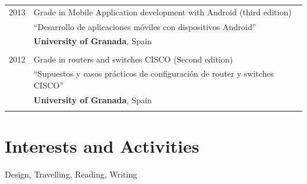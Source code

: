 \documentclass[a4paper,10pt]{article} %
\begin{document}
\begin{tabular}{rl}

\textsc{2013} & Grade in Mobile Application development with Android (third
edition) 
\\& ``Desarrollo de aplicaciones móviles con dispositivos Android''
\\& \normalsize\textbf{University of Granada}, Spain\\
&\\


\textsc{2012} & Grade in routers and switches CISCO (Second edition)
\\& ``Supuestos y casos prácticos de configuración de router y switches CISCO''
\\& \normalsize\textbf{University of Granada}, Spain\\
&\\


\end{tabular}


\section{Interests and Activities}

Design, Travelling, Reading, Writing
\end{document}
